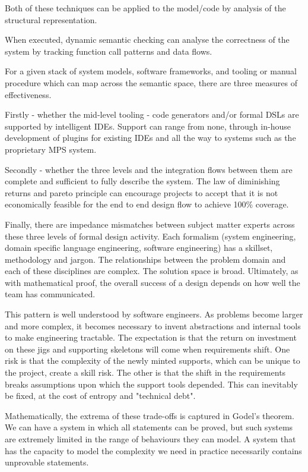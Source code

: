 \documentclass[5p]{elsarticle}
\begin{document}
Both of these techniques can be applied to the model/code
by analysis of the structural representation.

When executed, dynamic semantic checking can analyse the 
correctness of the system by tracking function call
patterns and data flows.

For a given stack of system models, 
software frameworks, and tooling or manual procedure which
can map across the semantic space, there are three
measures of effectiveness.

Firstly - whether the mid-level tooling - code generators and/or formal
DSLs are supported by intelligent IDEs.  Support can range from none,
through in-house development of plugins for existing IDEs and all the
way to systems such as the proprietary MPS system.

Secondly - whether the three levels and the integration flows
between them are complete and sufficient to fully describe
the system.  The law of diminishing returns and pareto principle
can encourage projects to accept that it is not economically
feasible for the end to end design flow to achieve 100\%
coverage.

Finally, there are impedance mismatches between subject matter experts
across these three levels of formal design activity.  Each formalism
(system engineering, domain specific language engineering, software
engineering) has a skillset, methodology and jargon.  The relationships
between the problem domain and each of these disciplines are complex.
The solution space is broad. Ultimately, as with mathematical proof,
the overall success of a design depends on how well the team has
communicated.

This pattern is well understood by software engineers.  As problems
become larger and more complex, it becomes necessary to invent
abstractions and internal tools to make engineering tractable.
The expectation is that the return on investment on these jigs
and supporting skeletons will come when requirements shift.
One risk is that the complexity of the newly minted supports,
which can be unique to the project, create a skill risk.
The other is that the shift in the requirements breaks
assumptions upon which the support tools depended.  This 
can inevitably be fixed, at the cost of entropy and
"technical debt".  

Mathematically, the extrema of these trade-offs is captured
in Godel's theorem.  We can have a system in which all statements
can be proved, but such systems are extremely limited in the
range of behaviours they can model.  A system that has the capacity
to model the complexity we need in practice necessarily 
contains unprovable statements.
\end{document}
